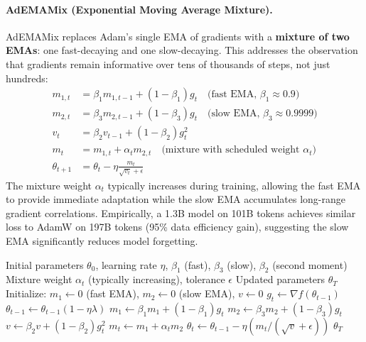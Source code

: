 \paragraph{AdEMAMix (Exponential Moving Average Mixture).}
AdEMAMix replaces Adam's single EMA of gradients with a \textbf{mixture of two EMAs}: one fast-decaying and one slow-decaying. This addresses the observation that gradients remain informative over tens of thousands of steps, not just hundreds:
\begin{align}
m_{1,t} &= \beta_1 m_{1,t-1} + (1-\beta_1)g_t \quad\text{(fast EMA, $\beta_1 \approx 0.9$)} \\
m_{2,t} &= \beta_3 m_{2,t-1} + (1-\beta_3)g_t \quad\text{(slow EMA, $\beta_3 \approx 0.9999$)} \\
v_t &= \beta_2 v_{t-1} + (1-\beta_2)g_t^2 \\
m_t &= m_{1,t} + \alpha_t m_{2,t} \quad\text{(mixture with scheduled weight $\alpha_t$)} \\
\theta_{t+1} &= \theta_t - \eta\frac{m_t}{\sqrt{v_t}+\epsilon}
\end{align}
The mixture weight $\alpha_t$ typically increases during training, allowing the fast EMA to provide immediate adaptation while the slow EMA accumulates long-range gradient correlations. Empirically, a 1.3B model on 101B tokens achieves similar loss to AdamW on 197B tokens (95\% data efficiency gain), suggesting the slow EMA significantly reduces model forgetting.

\begin{algorithm}[H]
\caption{AdEMAMix (Exponential Moving Average Mixture)}
\label{alg:ademamix}
\begin{algorithmic}[1]
\Require Initial parameters $\theta_0$, learning rate $\eta$, $\beta_1$ (fast), $\beta_3$ (slow), $\beta_2$ (second moment)
\Require Mixture weight $\alpha_t$ (typically increasing), tolerance $\epsilon$
\Ensure Updated parameters $\theta_T$
\State Initialize: $m_1 \gets 0$ (fast EMA), $m_2 \gets 0$ (slow EMA), $v \gets 0$
    \State $g_t \gets \nabla f(\theta_{t-1})$
        \State $\theta_{t-1} \gets \theta_{t-1}(1 - \eta\lambda)$
    \EndIf
    \State $m_1 \gets \beta_1 m_1 + (1-\beta_1) g_t$ 
    \State $m_2 \gets \beta_3 m_2 + (1-\beta_3) g_t$ 
    \State $v \gets \beta_2 v + (1-\beta_2) g_t^2$
    \State $m_t \gets m_1 + \alpha_t m_2$ 
    \State $\theta_t \gets \theta_{t-1} - \eta (m_t / (\sqrt{v} + \epsilon))$
\EndFor
\Return $\theta_T$
\end{algorithmic}
\end{algorithm}

